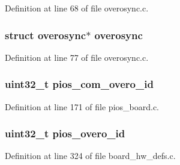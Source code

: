 \-Definition at line 68 of file overosync.\-c.

\hypertarget{group___overo_sync_module_ga34ce26c29a4ded07cf5f562126682017}{
\subsubsection[{overosync}]{\setlength{\rightskip}{0pt plus 5cm}struct {\bf overosync}$\ast$ {\bf overosync}}}\label{group___overo_sync_module_ga34ce26c29a4ded07cf5f562126682017}


\-Definition at line 77 of file overosync.\-c.

\hypertarget{group___overo_sync_module_gad93c8058f5c4d01e2ecc5670a0fa5407}{
\subsubsection[{pios\-\_\-com\-\_\-overo\-\_\-id}]{\setlength{\rightskip}{0pt plus 5cm}uint32\-\_\-t {\bf pios\-\_\-com\-\_\-overo\-\_\-id}}}\label{group___overo_sync_module_gad93c8058f5c4d01e2ecc5670a0fa5407}


\-Definition at line 171 of file pios\-\_\-board.\-c.

\hypertarget{group___overo_sync_module_ga6068626ce5d15d09ba077204ea2fd43d}{
\subsubsection[{pios\-\_\-overo\-\_\-id}]{\setlength{\rightskip}{0pt plus 5cm}uint32\-\_\-t {\bf pios\-\_\-overo\-\_\-id}}}\label{group___overo_sync_module_ga6068626ce5d15d09ba077204ea2fd43d}


\-Definition at line 324 of file board\-\_\-hw\-\_\-defs.\-c.

